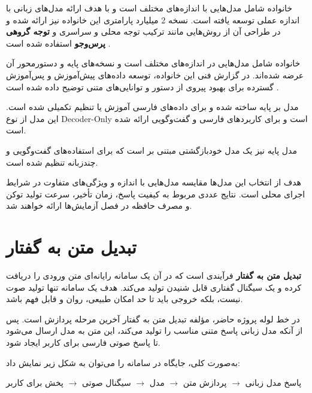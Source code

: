 خانواده  شامل مدل‌هایی با اندازه‌های مختلف است
و با هدف ارائه مدل‌های زبانی با اندازه عملی توسعه یافته است.
نسخه 2 میلیارد پارامتری این خانواده نیز ارائه شده و در طراحی
آن از روش‌هایی مانند ترکیب توجه محلی و سراسری و
\textbf{توجه گروهی پرس‌وجو}
استفاده شده است \cite{gemma2report}.

خانواده  شامل مدل‌هایی در اندازه‌های مختلف است و
نسخه‌های پایه و دستورمحور آن عرضه شده‌اند.
در گزارش فنی این خانواده، توسعه داده‌های پیش‌آموزش و
پس‌آموزش گسترده برای بهبود پیروی از دستور و توانایی‌های متنی
توضیح داده شده است \cite{qwen25report}.

مدل
بر پایه
ساخته شده و برای داده‌های فارسی آموزش یا تنظیم تکمیلی شده است.
این مدل از نوع Decoder-Only است و برای کاربردهای فارسی و
گفت‌وگویی ارائه شده است.

مدل پایه  نیز یک مدل خودبازگشتی
مبتنی بر  است که برای استفاده‌های گفت‌وگویی و
چندزبانه تنظیم شده است.

هدف از انتخاب این مدل‌ها مقایسه مدل‌هایی با اندازه و
ویژگی‌های متفاوت در شرایط اجرای محلی است.
نتایج عددی مربوط به کیفیت پاسخ، زمان تأخیر، سرعت تولید توکن
و مصرف حافظه در فصل آزمایش‌ها ارائه خواهند شد.


\section{تبدیل متن به گفتار}

\textbf{تبدیل متن به گفتار}
فرآیندی است که در آن یک سامانه رایانه‌ای متن ورودی را دریافت کرده
و یک سیگنال گفتاری قابل شنیدن تولید می‌کند.
هدف یک سامانه  تنها تولید صوت نیست، بلکه خروجی باید
تا حد امکان طبیعی، روان و قابل فهم باشد.

در خط لوله پروژه حاضر، مؤلفه تبدیل متن به گفتار آخرین مرحله
پردازش است.
پس از آنکه مدل زبانی پاسخ متنی مناسب را تولید می‌کند،
این متن به مدل  ارسال می‌شود تا پاسخ صوتی فارسی
برای کاربر ایجاد شود.

به‌صورت کلی، جایگاه  در سامانه را می‌توان به شکل زیر
نمایش داد:

\begin{center}
پاسخ مدل زبانی
$\longrightarrow$
پردازش متن
$\longrightarrow$
مدل 
$\longrightarrow$
سیگنال صوتی
$\longrightarrow$
پخش برای کاربر
\end{center}

